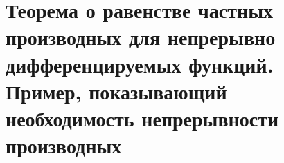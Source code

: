 \section{Теорема о равенстве частных производных для непрерывно дифференцируемых функций. Пример, показывающий необходимость непрерывности производных }
